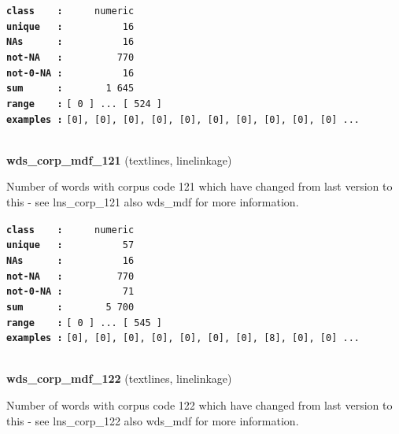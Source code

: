 \documentclass[]{article}
\begin{document}
\textbf{\texttt{class\ \ \ \ :}} \texttt{~~~~~numeric}\\
\textbf{\texttt{unique\ \ \ :}} \texttt{~~~~~~~~~~16}\\
\textbf{\texttt{NAs\ \ \ \ \ \ :}} \texttt{~~~~~~~~~~16}\\
\textbf{\texttt{not-NA\ \ \ :}} \texttt{~~~~~~~~~770}\\
\textbf{\texttt{not-0-NA\ :}} \texttt{~~~~~~~~~~16}\\
\textbf{\texttt{sum\ \ \ \ \ \ :}} \texttt{~~~~~~~1~645}\\
\textbf{\texttt{range\ \ \ \ :}}
\texttt{{[}\ 0\ {]}\ ...\ {[}\ 524\ {]}}\\
\textbf{\texttt{examples\ :}}
\texttt{{[}0{]},\ {[}0{]},\ {[}0{]},\ {[}0{]},\ {[}0{]},\ {[}0{]},\ {[}0{]},\ {[}0{]},\ {[}0{]},\ {[}0{]}\ ...}\\

~

\textbf{wds\_corp\_mdf\_121} (textlines, linelinkage)

Number of words with corpus code 121 which have changed from last
version to this - see lns\_corp\_121 also wds\_mdf for more information.

\textbf{\texttt{class\ \ \ \ :}} \texttt{~~~~~numeric}\\
\textbf{\texttt{unique\ \ \ :}} \texttt{~~~~~~~~~~57}\\
\textbf{\texttt{NAs\ \ \ \ \ \ :}} \texttt{~~~~~~~~~~16}\\
\textbf{\texttt{not-NA\ \ \ :}} \texttt{~~~~~~~~~770}\\
\textbf{\texttt{not-0-NA\ :}} \texttt{~~~~~~~~~~71}\\
\textbf{\texttt{sum\ \ \ \ \ \ :}} \texttt{~~~~~~~5~700}\\
\textbf{\texttt{range\ \ \ \ :}}
\texttt{{[}\ 0\ {]}\ ...\ {[}\ 545\ {]}}\\
\textbf{\texttt{examples\ :}}
\texttt{{[}0{]},\ {[}0{]},\ {[}0{]},\ {[}0{]},\ {[}0{]},\ {[}0{]},\ {[}0{]},\ {[}8{]},\ {[}0{]},\ {[}0{]}\ ...}\\

~

\textbf{wds\_corp\_mdf\_122} (textlines, linelinkage)

Number of words with corpus code 122 which have changed from last
version to this - see lns\_corp\_122 also wds\_mdf for more information.
\end{document}
